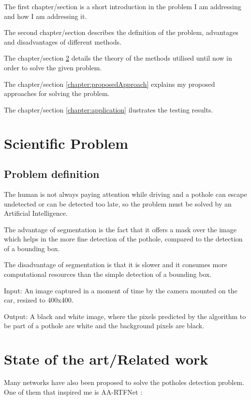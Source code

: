 \documentclass[runningheads,a4paper,11pt]{report}
\begin{document}
The first chapter/section is a short introduction in the problem I am addressing and how I am addressing it.

The second chapter/section describes the definition of the problem, advantages and disadvantages of different methods.

The chapter/section \ref{chapter:stateOfArt} details the theory of the methods utilised until now in order to solve the given problem.

The chapter/section \ref{chapter:proposedApproach} explains my proposed approaches for solving the problem.

The chapter/section \ref{chapter:application} ilustrates the testing results.


\chapter{Scientific Problem}
\label{section:scientificProblem}

\section{Problem definition}
\label{section:problemDefinition}

The human is not always paying attention while driving and a pothole can escape undetected or can be detected too late, so the problem must be solved by an Artificial Intelligence.

The advantage of segmentation is the fact that it offers a mask over the image which helps in the more fine detection of the pothole, compared to the detection of a bounding box.

The disadvantage of segmentation is that it is slower and it consumes more computational resources than the simple detection of a bounding box.

Input: An image captured in a moment of time by the camera mounted on the car, resized to 400x400.

Output: A black and white image, where the pixels predicted by the algorithm to be part of a pothole are white and the background pixels are black.


\chapter{State of the art/Related work}
\label{chapter:stateOfArt}

Many networks have also been proposed to solve the potholes detection problem. One of them that inspired me is AA-RTFNet \cite{fan2020we}:
\end{document}
